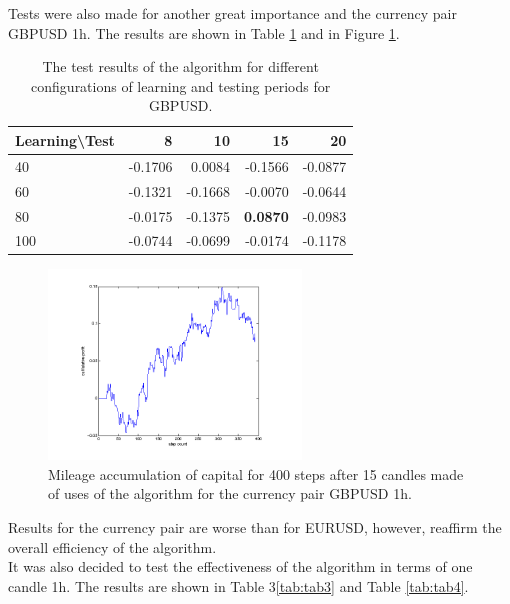 \documentclass[runningheads,a4paper]{llncs}
\begin{document}
Tests were also made for another great importance and the currency pair GBPUSD 1h. The results are shown in Table \ref{tab:tab2} and in Figure \ref{fig:fig9}.


\begin{table}[h!]
\centering
\caption{The test results of the algorithm for different configurations of learning and testing periods for GBPUSD.}
\label{tab:tab2}
\begin{tabular}{|l|r|r|r|r|} \hline
Learning\textbackslash Test &	8	 &	10	 &	15 &		20 \\ \hline
40	 &	-0.1706	 &	0.0084 &		-0.1566	 &	-0.0877 \\ \hline
60	 &	-0.1321	 &	-0.1668 &		-0.0070	 &	-0.0644 \\ \hline
80	 &	-0.0175	 &	-0.1375 &		\textbf{0.0870}	 &	-0.0983 \\ \hline
100	 &	-0.0744	 &	-0.0699	 &	-0.0174	 &	-0.1178 \\ \hline
\end{tabular}
\end{table}
\FloatBarrier

\begin{figure}[h!]
\centering
\includegraphics[width = 0.6\textwidth]{figures/rys9.png}
\caption{Mileage accumulation of capital for 400 steps after 15 candles made of uses of the algorithm for the currency pair GBPUSD 1h.}
\label{fig:fig9}
\end{figure}
\FloatBarrier

Results for the currency pair are worse than for EURUSD, however, reaffirm the overall efficiency of the algorithm.\\

It was also decided to test the effectiveness of the algorithm in terms of one candle 1h. The results are shown in Table 3\ref{tab:tab3} and Table \ref{tab:tab4}.
\end{document}
